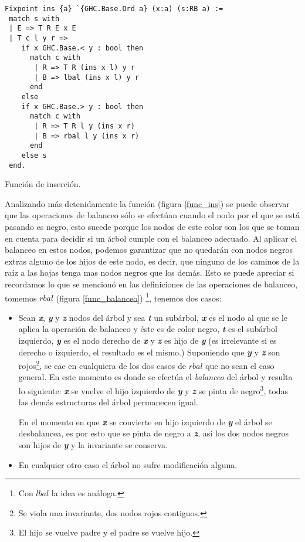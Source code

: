 \begin{listing}[!ht]
\centering
\captionsetup{justification=centering}
\begin{verbatim}
Fixpoint ins {a} `{GHC.Base.Ord a} (x:a) (s:RB a) :=
 match s with
 | E => T R E x E
 | T c l y r =>
    if x GHC.Base.< y : bool then
      match c with
       | R => T R (ins x l) y r
       | B => lbal (ins x l) y r
      end
    else
    if x GHC.Base.> y : bool then
      match c with
       | R => T R l y (ins x r)
       | B => rbal l y (ins x r)
      end
    else s
 end.
\end{verbatim}
\caption{Funci\'on de inserci\'on.}
\label{func_ins}
\end{listing}

Analizando m\'as detenidamente la funci\'on (figura \ref{func_ins}) se puede observar que las
operaciones de balanceo s\'olo se efectúan cuando el nodo por el que se est\'a pasando es negro, esto
sucede porque los nodos de este color son los que se toman en cuenta para decidir si
un \'arbol cumple con el balanceo adecuado. Al aplicar el balanceo en estos nodos, podemos 
garantizar que no quedar\'an con nodos negros extras alguno de los hijos de este nodo, es decir, que
ninguno de los caminos de la ra\'iz a las hojas tenga mas nodos negros que los demás. Esto se puede
apreciar si recordamos lo que se mencion\'o en las definiciones de las operaciones de balanceo, 
tomemos \hyperref[func_balanceo]{$rbal$} (figura \ref{func_balanceo})
\footnote{Con \hyperref[func_balanceo]{$lbal$} la idea es an\'aloga.}, tenemos dos casos:

\begin{itemize}
    \item Sean \textbf{\textit{x}}, \textbf{\textit{y}} y \textbf{\textit{z}} nodos del \'arbol y 
    sea \textbf{\textit{t}} un subárbol, \textbf{\textit{x}} es el nodo al que se le aplica la 
    operaci\'on de balanceo y \'este es de color negro, \textbf{\textit{t}} es el subárbol izquierdo,
    \textbf{\textit{y}} es el nodo derecho de \textbf{\textit{x}} y \textbf{\textit{z}} es hijo de
    \textbf{\textit{y}} (es irrelevante si es derecho o izquierdo, el resultado es el mismo.) 
    Suponiendo que \textbf{\textit{y}} y \textbf{\textit{z}} son rojos\footnote{Se viola una 
    invariante, dos nodos rojos contiguos.}, se cae en cualquiera de los dos casos de
    \hyperref[func_balanceo]{$rbal$} que no sean el caso general. En este momento es donde se 
    efectúa el \textit{balanceo} del árbol y resulta lo siguiente: \textbf{\textit{x}} se vuelve el 
    hijo izquierdo de \textbf{\textit{y}} y \textbf{\textit{z}} se pinta de negro\footnote{El hijo 
    se vuelve padre y el padre se vuelve hijo.}, todas las dem\'as estructuras del \'arbol 
    permanecen igual.

    En el momento en que \textbf{\textit{x}} se convierte en hijo izquierdo de \textbf{\textit{y}}
    el \'arbol se desbalancea, es por esto que se pinta de negro a \textbf{\textit{z}}, así los dos
    nodos negros son hijos de \textbf{\textit{y}} y la invariante se conserva.
    \item En cualquier otro caso el \'arbol no sufre modificaci\'on alguna.
\end{itemize}

